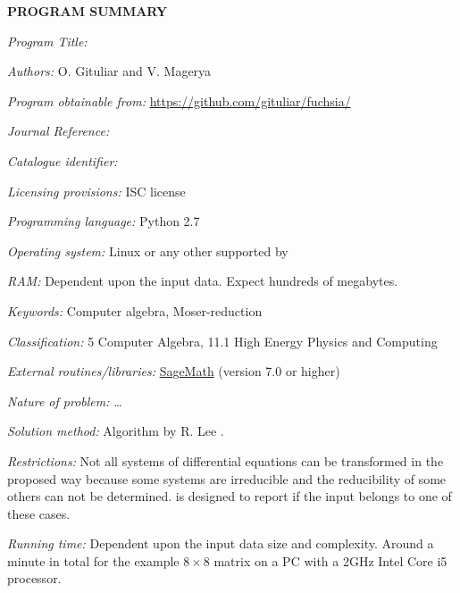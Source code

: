 {\bf PROGRAM SUMMARY}

\begin{small}
\noindent

{\em Program Title:}
    \fuchsia{}

{\em Authors:}
    O. Gituliar and V. Magerya

{\em Program obtainable from:}
    \url{https://github.com/gituliar/fuchsia/}

{\em Journal Reference:}

{\em Catalogue identifier:}

{\em Licensing provisions:}
    ISC license

{\em Programming language:}
    Python 2.7

{\em Operating system:}
    Linux or any other supported by \sage

{\em RAM:}
    Dependent upon the input data. Expect hundreds of megabytes.

{\em Keywords:}
    Computer algebra, Moser-reduction

{\em Classification:}
    5 Computer Algebra, 11.1 High Energy Physics and Computing

{\em External routines/libraries:}
    \href{http://www.sagemath.org/}{SageMath} (version 7.0 or higher)

{\em Nature of problem:}
    \ldots{}

{\em Solution method:}
    Algorithm by R. Lee \cite{Lee15}.

{\em Restrictions:}
    Not all systems of differential equations can be transformed
    in the proposed way because some systems are irreducible
    and the reducibility of some others can not be determined.
    \fuchsia{} is designed to report if the input belongs to
    one of these cases.

{\em Running time:}
    Dependent upon the input data size and complexity. Around
    a minute in total for the example $8\times8$ matrix on a PC
    with a 2GHz Intel Core i5 processor.

\end{small}
